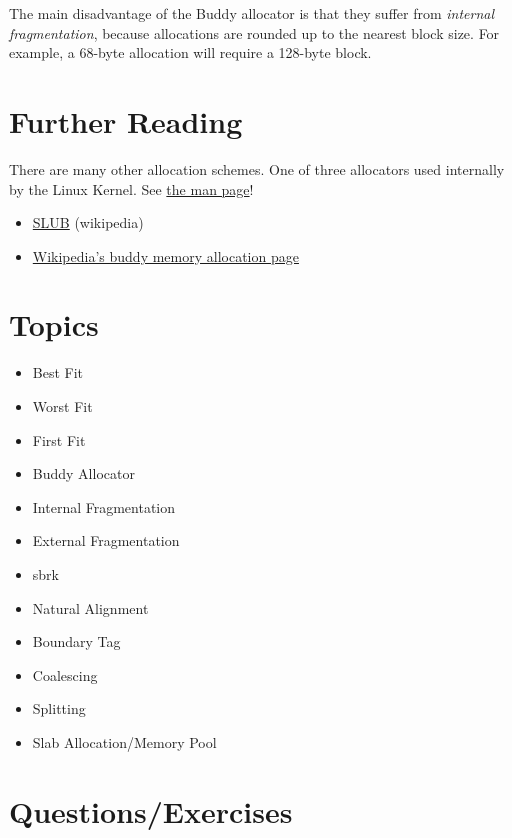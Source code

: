 The main disadvantage of the Buddy allocator is that they suffer from \emph{internal fragmentation}, because allocations are rounded up to the nearest block size.
For example, a 68-byte allocation will require a 128-byte block.

\section{Further Reading}

There are many other allocation schemes.
One of three allocators used internally by the Linux Kernel.
See \href{http://man7.org/linux/man-pages/man3/malloc.3.html}{the man page}!

\begin{itemize}
\item
  \href{http://en.wikipedia.org/wiki/SLUB_\%28software\%29}{SLUB} (wikipedia)
\item
  \href{http://en.wikipedia.org/wiki/Buddy_memory_allocation}{Wikipedia's buddy memory allocation page}
\end{itemize}

\section{Topics}

\begin{itemize}
\item
  Best Fit
\item
  Worst Fit
\item
  First Fit
\item
  Buddy Allocator
\item
  Internal Fragmentation
\item
  External Fragmentation
\item
  sbrk
\item
  Natural Alignment
\item
  Boundary Tag
\item
  Coalescing
\item
  Splitting
\item
  Slab Allocation/Memory Pool
\end{itemize}

\section{Questions/Exercises}


